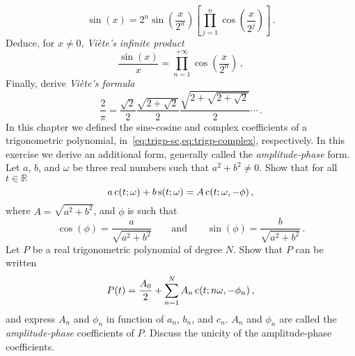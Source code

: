 \begin{ExerciseList}
  \begin{equation}
    \sin(x)=2^n\sin\left(\frac{x}{2^n}\right)\left[\prod_{j=1}^n\cos\left(\frac{x}{2^j}\right)\right]\,.
  \end{equation}
  \Question Deduce, for $x\neq 0$, \emph{Viète's infinite product}
  \begin{equation}
    \frac{\sin(x)}{x}=\prod_{n=1}^{+\infty}\cos\left(\frac{x}{2^n}\right)\,,
  \end{equation}
  \Question Finally, derive \emph{Viète's formula}
  \begin{equation}
    \frac{2}{\pi}=\frac{\sqrt{2}}{2}\frac{\sqrt{2+\sqrt{2}}}{2}\frac{\sqrt{2+\sqrt{2+\sqrt{2}}
    }}{2}\cdots\,.
  \end{equation}
  \Exercise[label=ampphase]
  In this chapter we defined the sine-cosine and complex coefficients of a trigonometric polynomial,
  in~\cref{eq:trigp-sc,eq:trigp-complex}, respectively. In this exercise we derive an additional form, generally called the \emph{amplitude-phase} form.
  \Question Let $a$, $b$, and $\omega$ be three real numbers such that $a^2+b^2\neq0$. Show that for all $t\in\mathbb{R}$
  \begin{equation}
    a\operatorname{c}(t;\omega)+b\operatorname{s}(t;\omega)=A\operatorname{c}(t;\omega,-\phi)\,,
  \end{equation}
  where $A=\sqrt{a^2+b^2}$, and $\phi$ is such that
  \begin{equation}
    \cos(\phi)=\frac{a}{\sqrt{a^2+b^2}}\qquad\text{and}\qquad
    \sin(\phi)=\frac{b}{\sqrt{a^2+b^2}}\,.
  \end{equation}
  \Question Let $P$ be a real trigonometric polynomial of degree $N$. Show that $P$ can be written
  \begin{equation}
    P(t)=\frac{A_0}{2}+\sum_{n=1}^NA_n\operatorname{c}(t;n\omega,-\phi_n)\,,
  \end{equation}
  and express $A_n$ and $\phi_n$ in function of $a_n$, $b_n$, and $c_n$. $A_n$ and $\phi_n$ are called the \emph{amplitude-phase} coefficients of $P$.
  \Question Discuss the unicity of the amplitude-phase coefficients.
\end{ExerciseList}